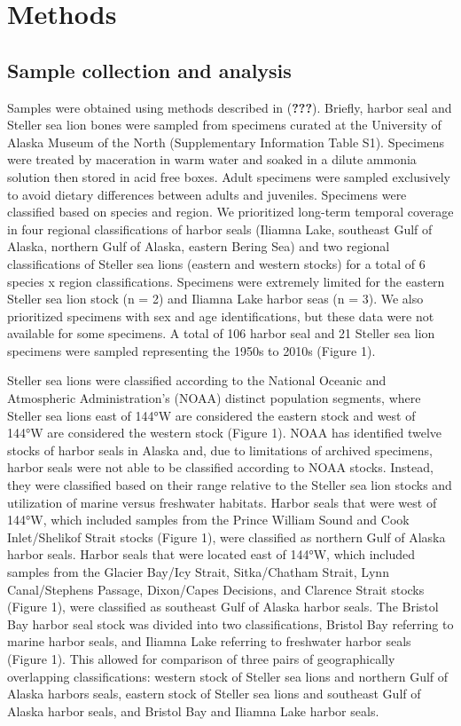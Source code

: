 \documentclass [11pt, proquest] {uwthesis}[2015/03/03]
\begin{document}
\section{Methods}\label{methods-2}

\subsection{Sample collection and
analysis}\label{sample-collection-and-analysis-1}

Samples were obtained using methods described in ({\textbf{???}}).
Briefly, harbor seal and Steller sea lion bones were sampled from
specimens curated at the University of Alaska Museum of the North
(Supplementary Information Table S1). Specimens were treated by
maceration in warm water and soaked in a dilute ammonia solution then
stored in acid free boxes. Adult specimens were sampled exclusively to
avoid dietary differences between adults and juveniles. Specimens were
classified based on species and region. We prioritized long-term
temporal coverage in four regional classifications of harbor seals
(Iliamna Lake, southeast Gulf of Alaska, northern Gulf of Alaska,
eastern Bering Sea) and two regional classifications of Steller sea
lions (eastern and western stocks) for a total of 6 species x region
classifications. Specimens were extremely limited for the eastern
Steller sea lion stock (n = 2) and Iliamna Lake harbor seas (n = 3). We
also prioritized specimens with sex and age identifications, but these
data were not available for some specimens. A total of 106 harbor seal
and 21 Steller sea lion specimens were sampled representing the 1950s to
2010s (Figure 1).

Steller sea lions were classified according to the National Oceanic and
Atmospheric Administration's (NOAA) distinct population segments, where
Steller sea lions east of 144°W are considered the eastern stock and
west of 144°W are considered the western stock (Figure 1). NOAA has
identified twelve stocks of harbor seals in Alaska and, due to
limitations of archived specimens, harbor seals were not able to be
classified according to NOAA stocks. Instead, they were classified based
on their range relative to the Steller sea lion stocks and utilization
of marine versus freshwater habitats. Harbor seals that were west of
144°W, which included samples from the Prince William Sound and Cook
Inlet/Shelikof Strait stocks (Figure 1), were classified as northern
Gulf of Alaska harbor seals. Harbor seals that were located east of
144°W, which included samples from the Glacier Bay/Icy Strait,
Sitka/Chatham Strait, Lynn Canal/Stephens Passage, Dixon/Capes
Decisions, and Clarence Strait stocks (Figure 1), were classified as
southeast Gulf of Alaska harbor seals. The Bristol Bay harbor seal stock
was divided into two classifications, Bristol Bay referring to marine
harbor seals, and Iliamna Lake referring to freshwater harbor seals
(Figure 1). This allowed for comparison of three pairs of geographically
overlapping classifications: western stock of Steller sea lions and
northern Gulf of Alaska harbors seals, eastern stock of Steller sea
lions and southeast Gulf of Alaska harbor seals, and Bristol Bay and
Iliamna Lake harbor seals.
\end{document}

